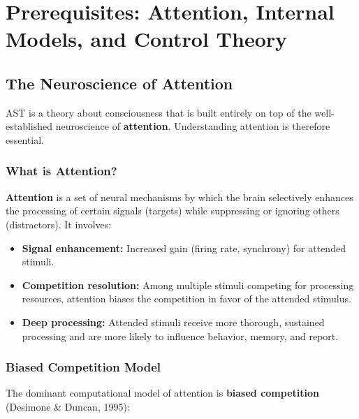 \documentclass[11pt,a4paper]{report}
\begin{document}
\chapter{Prerequisites: Attention, Internal Models, and Control Theory}

\section{The Neuroscience of Attention}

AST is a theory about consciousness that is built entirely on top of the well-established neuroscience of \textbf{attention}. Understanding attention is therefore essential.

\subsection{What is Attention?}

\begin{definitionbox}
\textbf{Attention} is a set of neural mechanisms by which the brain selectively enhances the processing of certain signals (targets) while suppressing or ignoring others (distractors). It involves:
\begin{itemize}[leftmargin=1.5em]
  \item \textbf{Signal enhancement:} Increased gain (firing rate, synchrony) for attended stimuli.
  \item \textbf{Competition resolution:} Among multiple stimuli competing for processing resources, attention biases the competition in favor of the attended stimulus.
  \item \textbf{Deep processing:} Attended stimuli receive more thorough, sustained processing and are more likely to influence behavior, memory, and report.
\end{itemize}
\end{definitionbox}

\subsection{Biased Competition Model}

The dominant computational model of attention is \textbf{biased competition} (Desimone \& Duncan, 1995):
\end{document}
